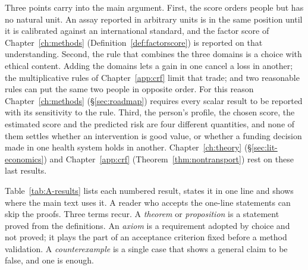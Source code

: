 Three points carry into the main argument. First, the score orders people but
has no natural unit. An assay reported in arbitrary units is in the same
position until it is calibrated against an international standard, and the
factor score of Chapter~\ref{ch:methods} (Definition~\ref{def:factorscore}) is
reported on that understanding. Second, the rule that combines the three
domains is a choice with ethical content. Adding the domains lets a gain in one
cancel a loss in another; the multiplicative rules of Chapter~\ref{app:crf}
limit that trade; and two reasonable rules can put the same two people in
opposite order. For this reason Chapter~\ref{ch:methods} (\S\ref{sec:roadmap})
requires every scalar result to be reported with its sensitivity to the rule.
Third, the person's profile, the chosen score, the estimated score and the
predicted risk are four different quantities, and none of them settles whether
an intervention is good value, or whether a funding decision made in one health
system holds in another. Chapter~\ref{ch:theory} (\S\ref{sec:lit-economics})
and Chapter~\ref{app:crf} (Theorem~\ref{thm:nontransport}) rest on these last
results.

Table~\ref{tab:A-results} lists each numbered result, states it in one line
and shows where the main text uses it. A reader who accepts the one-line
statements can skip the proofs. Three terms recur. A \emph{theorem} or
\emph{proposition} is a statement proved from the definitions. An
\emph{axiom} is a requirement adopted by choice and not proved; it plays the
part of an acceptance criterion fixed before a method validation. A
\emph{counterexample} is a single case that shows a general claim to be false,
and one is enough.

